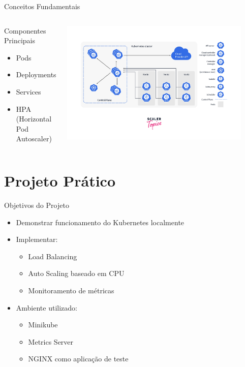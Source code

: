 \documentclass{beamer}
\begin{document}
\begin{frame}{Conceitos Fundamentais}
    \begin{columns}
        \begin{block}{Componentes Principais}
            \begin{itemize}
                \item Pods
                \item Deployments
                \item Services
                \item HPA (Horizontal Pod Autoscaler)
            \end{itemize}
        \end{block}

        \centering
        \includegraphics[width=0.9\textwidth]{k8s-components.png}
    \end{columns}
\end{frame}

\section{Projeto Prático}

\begin{frame}{Objetivos do Projeto}
    \begin{itemize}
        \item Demonstrar funcionamento do Kubernetes localmente
        \item Implementar:
        \begin{itemize}
            \item Load Balancing
            \item Auto Scaling baseado em CPU
            \item Monitoramento de métricas
        \end{itemize}
        \item Ambiente utilizado:
        \begin{itemize}
            \item Minikube
            \item Metrics Server
            \item NGINX como aplicação de teste
        \end{itemize}
    \end{itemize}
\end{frame}
\end{document}
